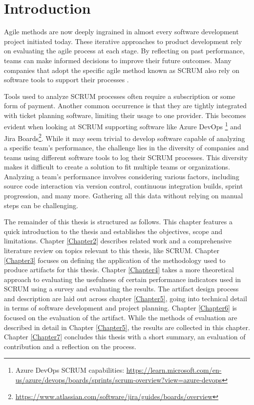 \chapter{Introduction}
\label{Chapter1}

Agile methods are now deeply ingrained in almost every software development project initiated today.
These iterative approaches to product development rely on evaluating the agile 
process at each stage. By reflecting on past performance, 
teams can make informed decisions to improve their future outcomes. 
Many companies that adopt the specific agile method known as SCRUM also 
rely on software tools to support their processes \parencite{Katsma2013Can}.

Tools used to analyze SCRUM processes often require 
a subscription or some form of payment. 
Another common occurrence is that they are tightly integrated with ticket planning software, 
limiting their usage to one provider. 
This becomes evident when looking at SCRUM supporting software like Azure DevOps
\footnote{Azure DevOps SCRUM capabilities: \url{https://learn.microsoft.com/en-us/azure/devops/boards/sprints/scrum-overview?view=azure-devops}}
and Jira Boards\footnote{\url{https://www.atlassian.com/software/jira/guides/boards/overview}}.
While it may seem trivial to develop software capable of analyzing a specific 
team's performance, the challenge lies in the diversity of companies and teams 
using different software tools to log their SCRUM processes. 
This diversity makes it difficult to create a solution to fit multiple teams or organizations. 
Analyzing a team's performance involves considering various factors, 
including source code interaction via version control, continuous integration builds, 
sprint progression, and many more. 
Gathering all this data without relying on manual steps can be challenging.

The remainder of this thesis is structured as follows. 
This chapter features a quick introduction to the thesis and 
establishes the objectives, scope and limitations. 
Chapter \ref{Chapter2} describes related work and a comprehensive 
literature review on topics relevant to this thesis, like SCRUM. 
Chapter \ref{Chapter3} focuses on defining the application of the 
methodology used to produce artifacts for this thesis. 
Chapter \ref{Chapter4} takes a more theoretical approach to evaluating 
the usefulness of certain performance indicators used in SCRUM using a 
survey and evaluating the results. 
The artifact design process and description are laid out across chapter \ref{Chapter5}, 
going into technical detail in terms of software development and project planning. 
Chapter \ref{Chapter6} is focused on the evaluation of the artifact. 
While the methods of evaluation are described in detail in Chapter \ref{Chapter5}, 
the results are collected in this chapter. 
Chapter \ref{Chapter7} concludes this thesis with a short summary, 
an evaluation of contribution and a reflection on the process.
 
